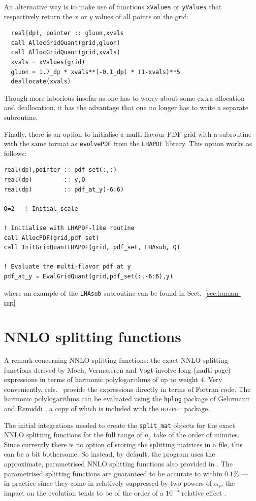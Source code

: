 \documentclass[12pt]{article}
\newcommand{\as}{\alpha_s}
\newcommand{\hoppet}{\textsc{hoppet}\xspace}
\newcommand{\ttt}[1]{\texttt{#1}}
\begin{document}
An alternative way is to
make use of functions \texttt{xValues} or \texttt{yValues} that
respectively return the $x$ or $y$ values of all points on the grid:
\begin{lstlisting}
  real(dp), pointer :: gluon,xvals
  call AllocGridQuant(grid,gluon)
  call AllocGridQuant(grid,xvals)
  xvals = xValues(grid)
  gluon = 1.7_dp * xvals**(-0.1_dp) * (1-xvals)**5 
  deallocate(xvals)
\end{lstlisting}
Though more laborious insofar as one has to worry about some extra
allocation and deallocation, it has the advantage that one no longer
has to write a separate subroutine.

Finally, there is an option to initialise a multi-flavour
PDF grid with a subroutine with the same format as
\ttt{evolvePDF} from the \ttt{LHAPDF} library. This
option works as follows:

\begin{lstlisting}
real(dp),pointer :: pdf_set(:,:)
real(dp)         :: y,Q
real(dp)         :: pdf_at_y(-6:6)

Q=2   ! Initial scale

! Initialise with LHAPDF-like routine
call AllocPDF(grid,pdf_set)
call InitGridQuantLHAPDF(grid, pdf_set, LHAsub, Q)

! Evaluate the multi-flavor pdf at y
pdf_at_y = EvalGridQuant(grid,pdf_set(:,-6:6),y)

\end{lstlisting}
where an example of  the \ttt{LHAsub} subroutine can be found in
Sect.~\ref{sec:human-rep}

\section{NNLO splitting functions}
\label{sect:nnlo}
A remark concerning NNLO splitting functions: the exact NNLO splitting
functions derived by Moch, Vermaseren and Vogt
\cite{NNLO-NS,NNLO-singlet} involve long (multi-page) expressions in
terms of harmonic polylogarithms of up to weight 4. Very conveniently,
refs.~\cite{NNLO-NS,NNLO-singlet} provide the expressions directly in
terms of Fortran code.
%
The harmonic polylogarithms can be evaluated using the \ttt{hplog}
package of Gehrmann and Remiddi \cite{FortranPolyLog}, a copy of which
is included with the \hoppet package. 

The initial integrations needed to create the \ttt{split\_mat} objects
for the exact NNLO splitting functions for the full range of $n_f$
take of the order of minutes.  Since currently there is no option of
storing the splitting matrices in a file, this can be a bit
bothersome. So instead, by default, the program uses the approximate,
parametrised NNLO splitting functions also provided in
\cite{NNLO-NS,NNLO-singlet}. The parametrised splitting functions are
guaranteed to be accurate to within $0.1\%$ --- in practice since they
come in relatively suppressed by two powers of $\as$, the impact on
the evolution tends to be of the order of a  $10^{-5}$ relative effect
\cite{Benchmarks}.
\end{document}
